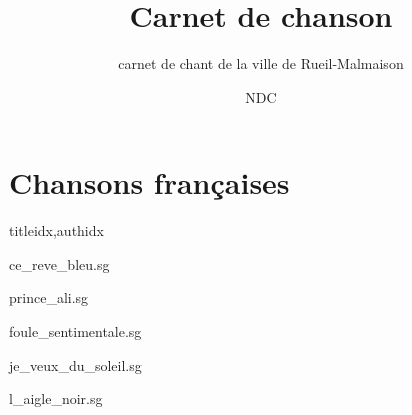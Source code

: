 \documentclass[12pt]{article}
\title{Carnet de chanson}
\author{NDC}
\subtitle{carnet de chant de la ville de Rueil-Malmaison}
\newcommand{\phantomsection}{}
\begin{document}
\maketitle



\ifdiagrampage
   \phantomsection
   \chords
\fi
\setcounter{songnum}{1}%

\phantomsection
{}


\part*{Chansons françaises}

\begin{songs}{titleidx,authidx}

{ce_reve_bleu.sg}


{prince_ali.sg}


{foule_sentimentale.sg}


{je_veux_du_soleil.sg}


{l_aigle_noir.sg}



\end{songs}
\end{document}
